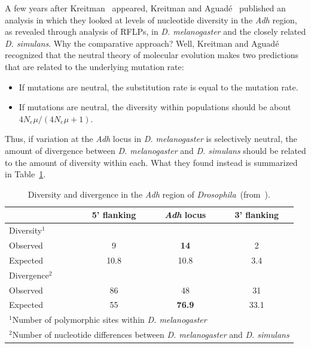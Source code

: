 \documentclass[12pt]{article}
\begin{document}
A few years after Kreitman~\cite{Kreitman83} appeared, Kreitman and
Aguad{\'e}~\cite{Kreitman-Aguade86} published an analysis in which
they looked at levels of nucleotide diversity in the {\it Adh\/}
region, as revealed through analysis of RFLPs, in {\it
  D. melanogaster\/} and the closely related {\it D. simulans}. Why
the comparative approach? Well, Kreitman and Aguad{\'e} recognized
that the neutral theory of molecular evolution makes two predictions
that are related to the underlying mutation rate:

\begin{itemize}

\item If mutations are neutral, the substitution rate is equal to the
  mutation rate.

\item If mutations are neutral, the diversity within populations
  should be about $4N_e\mu/(4N_e\mu + 1)$.

\end{itemize}

\noindent Thus, if variation at the {\it Adh\/} locus in {\it
  D. melanogaster\/} is selectively neutral, the amount of divergence
between {\it D. melanogaster\/} and {\it D. simulans\/} should be
related to the amount of diversity within each. What they found
instead is summarized in Table~\ref{table:ka}.

\begin{table}
\begin{center}
\begin{tabular}{l|ccc}
\hline\hline
         & 5' flanking & {\it Adh\/} locus & 3' flanking \\
\hline
Diversity$^1$ \\
\quad Observed & 9     & {\bf 14}   & 2    \\
\quad Expected & 10.8  & 10.8 & 3.4  \\
Divergence$^2$ \\
\quad Observed & 86    & 48   & 31   \\
\quad Expected & 55    & {\bf 76.9} & 33.1 \\
\hline
\multicolumn{4}{l}{$^1$Number of polymorphic sites within {\it
         D. melanogaster\/}} \\
\multicolumn{4}{l}{$^2$Number of nucleotide differences between {\it
         D. melanogaster\/} and {\it D. simulans}}
\end{tabular}
\end{center}
\caption{Diversity and divergence in the {\it Adh\/} region of {\it
    Drosophila}~(from~\cite{Kreitman-Aguade86}).}\label{table:ka}
\end{table}
\end{document}
